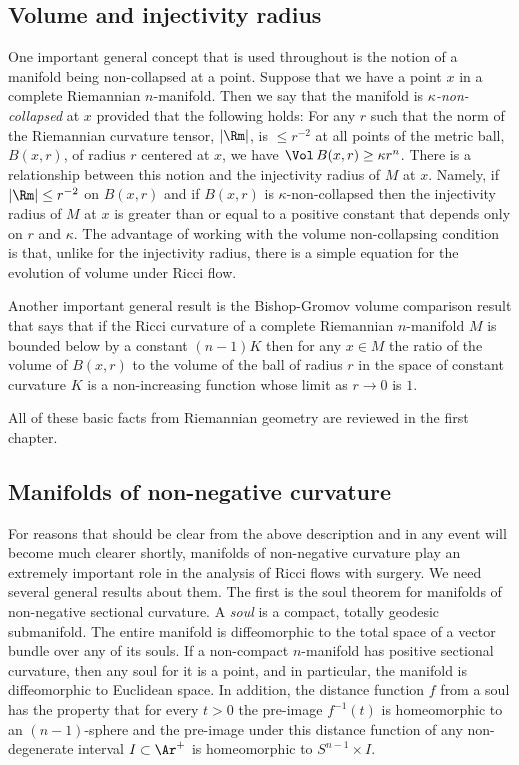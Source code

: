 \subsection{Volume and injectivity radius}

One important general concept that is used throughout is the notion
of a manifold being non-collapsed at a point. Suppose that we have a
point $x$ in a complete Riemannian $n$-manifold. Then we say that
the manifold is {\em
$\kappa$-non-collapsed} at $x$
provided that the following holds: For any $r$ such that the norm of
the Riemannian curvature tensor, $|\Rm|$, is $\le r^{-2}$ at
all points of the metric ball, $B(x,r)$, of radius $r$ centered at
$x$,  we have $\Vol\, B(x,r)\ge \kappa r^n$. There is a
relationship between this notion and the injectivity
radius of $M$ at $x$. Namely, if $|\Rm|\le r^{-2}$ on $B(x,r)$ and if $B(x,r)$ is
$\kappa$-non-collapsed then the injectivity radius of $M$ at $x$ is
greater than or equal to  a positive constant that depends only on
$r$ and $\kappa$. The advantage of working with the volume
non-collapsing condition is that, unlike for the injectivity radius,
there is a simple equation for the evolution of volume under Ricci
flow.

Another important general result is the Bishop-Gromov volume
comparison result that says that if the
Ricci curvature of a complete Riemannian $n$-manifold $M$ is bounded
below by a constant $(n-1)K$  then for any $x\in M$ the ratio of the
volume of $B(x,r)$ to the volume of the ball of radius $r$ in the
space of constant curvature $K$ is a non-increasing function whose
limit as $r\rightarrow 0$ is $1$.

All of these basic facts from Riemannian geometry are reviewed in
the first chapter.


\subsection{Manifolds of non-negative curvature}

For reasons that should be clear from the above description and in
any event will become much clearer shortly, manifolds of
non-negative curvature play an extremely important role in the
analysis of Ricci flows with surgery. We need several general
results about them. The first is the soul theorem for manifolds of
non-negative sectional curvature. A {\em soul} is a compact, totally
geodesic submanifold. The entire manifold is diffeomorphic to the
total space of a vector bundle over any of its souls. If a
non-compact $n$-manifold has positive sectional curvature, then any
soul for it is a point, and in particular, the manifold is
diffeomorphic to Euclidean space. In addition, the distance function
$f$ from a soul has the property that for every $t>0$ the pre-image
$f^{-1}(t)$ is homeomorphic to an $(n-1)$-sphere and the pre-image
under this distance function of any non-degenerate interval
$I\subset \Ar ^+$ is homeomorphic to $S^{n-1}\times I$.


